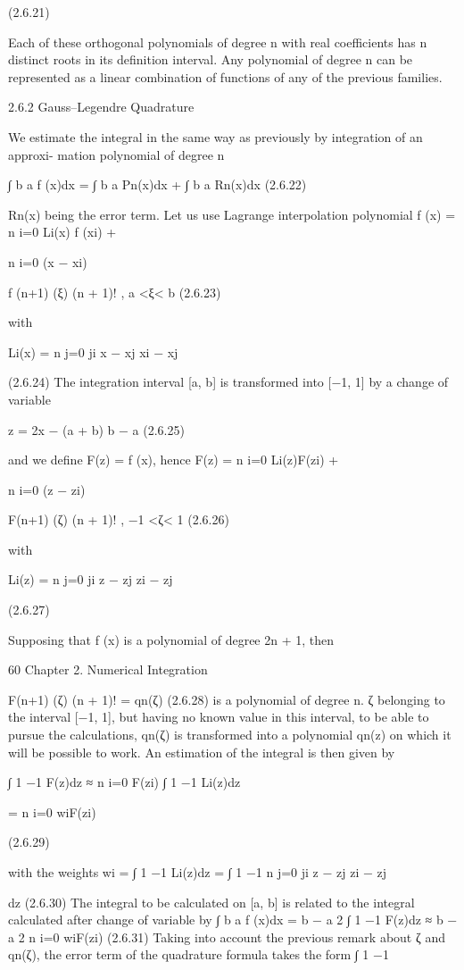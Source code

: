 \documentclass[letterpaper,12pt]{article}
\begin{document}
(2.6.21)

Each of these orthogonal polynomials of degree n with real coefficients has n distinct
roots in its definition interval. Any polynomial of degree n can be represented as a
linear combination of functions of any of the previous families.

2.6.2 Gauss–Legendre Quadrature

We estimate the integral in the same way as previously by integration of an approxi-
mation polynomial of degree n

∫ b
a
f (x)dx =
∫ b
a
Pn(x)dx +
∫ b
a
Rn(x)dx (2.6.22)

Rn(x) being the error term.
Let us use Lagrange interpolation polynomial
f (x) =
n
i=0
Li(x) f (xi) +

n
i=0
(x − xi)

f (n+1)
(ξ)
(n + 1)! , a <ξ< b (2.6.23)

with

Li(x) =
n
j=0
ji
 x − xj
xi − xj


(2.6.24)
The integration interval [a, b] is transformed into [−1, 1] by a change of variable

z = 2x − (a + b)
b − a (2.6.25)

and we define F(z) = f (x), hence
F(z) =
n
i=0
Li(z)F(zi) +

n
i=0
(z − zi)

F(n+1)
(ζ)
(n + 1)! , −1 <ζ< 1 (2.6.26)

with

Li(z) =
n
j=0
ji
 z − zj
zi − zj


(2.6.27)

Supposing that f (x) is a polynomial of degree 2n + 1, then

60 Chapter 2. Numerical Integration

F(n+1)
(ζ)
(n + 1)! = qn(ζ) (2.6.28)
is a polynomial of degree n. ζ belonging to the interval [−1, 1], but having no known
value in this interval, to be able to pursue the calculations, qn(ζ) is transformed into a
polynomial qn(z) on which it will be possible to work.
An estimation of the integral is then given by

∫ 1
−1
F(z)dz ≈
n
i=0
F(zi)
∫ 1
−1
Li(z)dz

=
n
i=0
wiF(zi)

(2.6.29)

with the weights
wi =
∫ 1
−1
Li(z)dz =
∫ 1
−1
n
j=0
ji
 z − zj
zi − zj

dz (2.6.30)
The integral to be calculated on [a, b] is related to the integral calculated after
change of variable by
∫ b
a
f (x)dx = b − a
2
∫ 1
−1
F(z)dz ≈ b − a
2
n
i=0
wiF(zi) (2.6.31)
Taking into account the previous remark about ζ and qn(ζ), the error term of the
quadrature formula takes the form
∫ 1
−1
\end{document}
